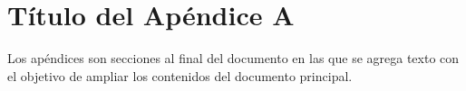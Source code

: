 \chapter{Título del Apéndice A}
\label{Appendix:Key1}

Los apéndices son secciones al final del documento en las que se agrega texto con el
objetivo de ampliar los contenidos del documento principal.
